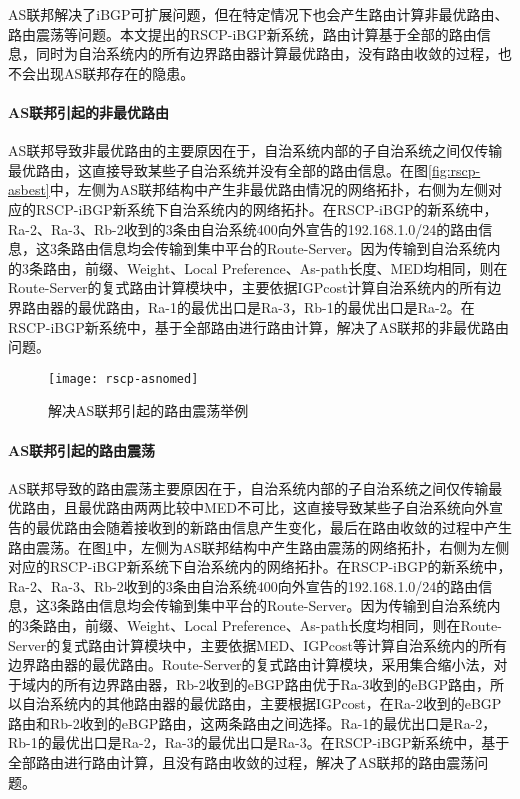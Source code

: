 AS联邦解决了iBGP可扩展问题，但在特定情况下也会产生路由计算非最优路由、路由震荡等问题。本文提出的RSCP-iBGP新系统，路由计算基于全部的路由信息，同时为自治系统内的所有边界路由器计算最优路由，没有路由收敛的过程，也不会出现AS联邦存在的隐患。\\

\paragraph{AS联邦引起的非最优路由}
AS联邦导致非最优路由的主要原因在于，自治系统内部的子自治系统之间仅传输最优路由，这直接导致某些子自治系统并没有全部的路由信息。在图\ref{fig:rscp-asbest}中，左侧为AS联邦结构中产生非最优路由情况的网络拓扑，右侧为左侧对应的RSCP-iBGP新系统下自治系统内的网络拓扑。在RSCP-iBGP的新系统中，Ra-2、Ra-3、Rb-2收到的3条由自治系统400向外宣告的192.168.1.0/24的路由信息，这3条路由信息均会传输到集中平台的Route-Server。因为传输到自治系统内的3条路由，前缀、Weight、Local Preference、As-path长度、MED均相同，则在Route-Server的复式路由计算模块中，主要依据IGPcost计算自治系统内的所有边界路由器的最优路由，Ra-1的最优出口是Ra-3，Rb-1的最优出口是Ra-2。在RSCP-iBGP新系统中，基于全部路由进行路由计算，解决了AS联邦的非最优路由问题。\\




\begin{figure}
  \centering
  \texttt{[image: rscp-asnomed]}
  \caption{解决AS联邦引起的路由震荡举例}
  \label{fig:rscp-asnomed}
\end{figure}

\paragraph{AS联邦引起的路由震荡}

AS联邦导致的路由震荡主要原因在于，自治系统内部的子自治系统之间仅传输最优路由，且最优路由两两比较中MED不可比，这直接导致某些子自治系统向外宣告的最优路由会随着接收到的新路由信息产生变化，最后在路由收敛的过程中产生路由震荡。在图\ref{fig:rscp-asnomed}中，左侧为AS联邦结构中产生路由震荡的网络拓扑，右侧为左侧对应的RSCP-iBGP新系统下自治系统内的网络拓扑。在RSCP-iBGP的新系统中，Ra-2、Ra-3、Rb-2收到的3条由自治系统400向外宣告的192.168.1.0/24的路由信息，这3条路由信息均会传输到集中平台的Route-Server。因为传输到自治系统内的3条路由，前缀、Weight、Local Preference、As-path长度均相同，则在Route-Server的复式路由计算模块中，主要依据MED、IGPcost等计算自治系统内的所有边界路由器的最优路由。Route-Server的复式路由计算模块，采用集合缩小法，对于域内的所有边界路由器，Rb-2收到的eBGP路由优于Ra-3收到的eBGP路由，所以自治系统内的其他路由器的最优路由，主要根据IGPcost，在Ra-2收到的eBGP路由和Rb-2收到的eBGP路由，这两条路由之间选择。Ra-1的最优出口是Ra-2，Rb-1的最优出口是Ra-2，Ra-3的最优出口是Ra-3。在RSCP-iBGP新系统中，基于全部路由进行路由计算，且没有路由收敛的过程，解决了AS联邦的路由震荡问题。

